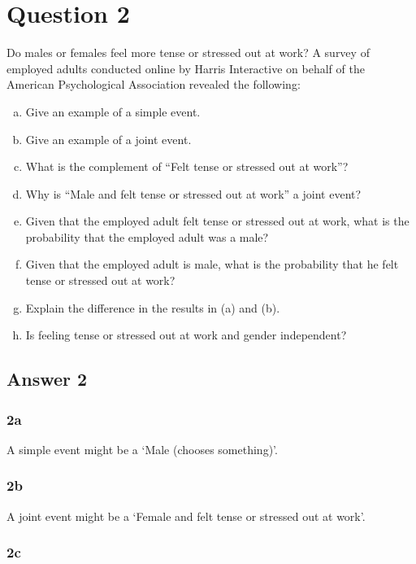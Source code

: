 \documentclass[
	11pt, %
]{assignment}
\begin{document}
\section*{Question 2}
\begin{problem}
Do males or females feel more tense or stressed out
at work? A survey of employed adults conducted online by Harris Interactive
on behalf of the American Psychological Association revealed the following:

\begin{enumerate}[a.]
	\item Give an example of a simple event.
	\item Give an example of a joint event.
	\item What is the complement of “Felt tense or stressed out at work”?
	\item Why is “Male and felt tense or stressed out at work” a joint event?
	\item Given that the employed adult felt tense or stressed out at work, what is the probability that the employed adult was a male?
	\item Given that the employed adult is male, what is the probability that he felt tense or stressed out at work?
	\item Explain the difference in the results in (a) and (b).
	\item Is feeling tense or stressed out at work and gender independent?
\end{enumerate}
\end{problem}

\subsection*{Answer 2}

\subsubsection*{2a}

A simple event might be a `Male (chooses something)'.

\subsubsection*{2b}

A joint event might be a `Female and felt tense or stressed out at work'.

\subsubsection*{2c}
\end{document}
